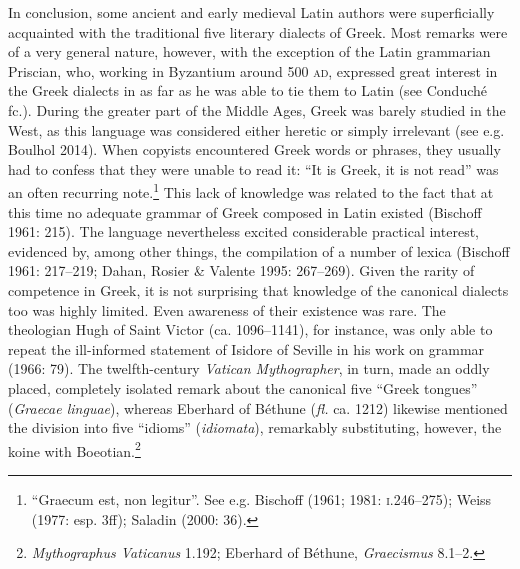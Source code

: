 \documentclass[12pt]{article}
\newenvironment{styleStandard}{\renewcommand\baselinestretch{1.25}\setlength\leftskip{0in}\setlength\rightskip{0in}\setlength\parindent{0.1972in}\setlength\parfillskip{0pt plus 1fil}\setlength\parskip{0in plus 1pt}\writerlistparindent\writerlistleftskip\leavevmode\normalfont\normalsize\writerlistlabel\ignorespaces}{\unskip\vspace{0in plus 1pt}\par}
\newcommand\writerlistleftskip{}
\newcommand\writerlistparindent{}
\newcommand\writerlistlabel{}
\begin{document}
\begin{styleStandard}
In conclusion, some ancient and early medieval Latin authors were superficially acquainted with the traditional five literary dialects of Greek. Most remarks were of a very general nature, however, with the exception of the Latin grammarian Priscian, who, working in Byzantium around 500 \textsc{ad}, expressed great interest in the Greek dialects in as far as he was able to tie them to Latin (see Conduché fc.). During the greater part of the Middle Ages, Greek was barely studied in the West, as this language was considered either heretic or simply irrelevant (see e.g. Boulhol 2014). When copyists encountered Greek words or phrases, they usually had to confess that they were unable to read it: “It is Greek, it is not read” was an often recurring note.\footnote{\textrm{ }“Graecum est, non legitur”. \textrm{See e.g. Bischoff (1961; 1981: }\textrm{\textsc{i.}}\textrm{246–275); Weiss (1977: esp. 3ff);}\textrm{\textsc{ }}\textrm{Saladin (2000: 36).}} This lack of knowledge was related to the fact that at this time no adequate grammar of Greek composed in Latin existed (Bischoff 1961: 215). The language nevertheless excited considerable practical interest, evidenced by, among other things, the compilation of a number of lexica (Bischoff 1961: 217–219; Dahan, Rosier \& Valente 1995: 267–269). Given the rarity of competence in Greek, it is not surprising that knowledge of the canonical dialects too was highly limited. Even awareness of their existence was rare. The theologian Hugh of Saint Victor (ca. 1096–1141), for instance, was only able to repeat the ill-informed statement of Isidore of Seville in his work on grammar (1966: 79). The twelfth-century \textit{Vatican Mythographer}, in turn, made an oddly placed, completely isolated remark about the canonical five “Greek tongues” (\textit{Graecae linguae}), whereas Eberhard of Béthune (\textit{fl.} ca. 1212) likewise mentioned the division into five “idioms” (\textit{idiomata}), remarkably substituting, however, the koine with Boeotian.\footnote{ \textit{Mythographus Vaticanus} 1.192; Eberhard of Béthune, \textit{Graecismus} 8.1–2.}
\end{styleStandard}
\end{document}
